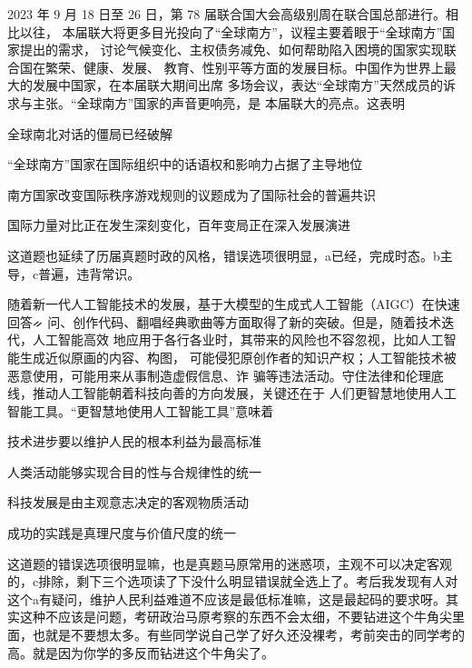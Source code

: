 \documentclass[lang=cn,blue,10pt,scheme=chinese,twocol]{zznote}
\begin{document}
\begin{exercise}2023 年 9 月 18 日至 26 日，第 78 届联合国大会高级别周在联合国总部进行。相比以往， 本届联大将更多目光投向了“全球南方”，议程主要着眼于“全球南方”国家提出的需求， 讨论气候变化、主权债务减免、如何帮助陷入困境的国家实现联合国在繁荣、健康、发展、 教育、性别平等方面的发展目标。中国作为世界上最大的发展中国家，在本届联大期间出席 多场会议，表达“全球南方”天然成员的诉求与主张。“全球南方”国家的声音更响亮，是 本届联大的亮点。这表明
	\begin{choice}
		\item 全球南北对话的僵局已经破解
		\item “全球南方”国家在国际组织中的话语权和影响力占据了主导地位
		\item 南方国家改变国际秩序游戏规则的议题成为了国际社会的普遍共识
		\item 国际力量对比正在发生深刻变化，百年变局正在深入发展演进
	\end{choice}
\end{exercise}
\begin{solution}
	这道题也延续了历届真题时政的风格，错误选项很明显，a已经，完成时态。b主导，c普遍，违背常识。
\end{solution}


\begin{exercise}随着新一代人工智能技术的发展，基于大模型的生成式人工智能（AIGC）在快速回答ᨀ 问、创作代码、翻唱经典歌曲等方面取得了新的突破。但是，随着技术迭代，人工智能高效 地应用于各行各业时，其带来的风险也不容忽视，比如人工智能生成近似原画的内容、构图， 可能侵犯原创作者的知识产权；人工智能技术被恶意使用，可能用来从事制造虚假信息、诈 骗等违法活动。守住法律和伦理底线，推动人工智能朝着科技向善的方向发展，关键还在于 人们更智慧地使用人工智能工具。“更智慧地使用人工智能工具”意味着
	\begin{choice}
		\item 技术进步要以维护人民的根本利益为最高标准
		\item 人类活动能够实现合目的性与合规律性的统一
		\item 科技发展是由主观意志决定的客观物质活动
		\item 成功的实践是真理尺度与价值尺度的统一
	\end{choice}
\end{exercise}
\begin{solution}
	​这道题的错误选项很明显嘛，也是真题马原常用的迷惑项，主观不可以决定客观的，c排除，剩下三个选项读了下没什么明显错误就全选上了。考后我发现有人对这个a有疑问，维护人民利益难道不应该是最低标准嘛，这是最起码的要求呀。其实这种不应该是问题，考研政治马原考察的东西不会太细，不要钻进这个牛角尖里面，也就是不要想太多。有些同学说自己学了好久还没裸考，考前突击的同学考的高。就是因为你学的多反而钻进这个牛角尖了。
\end{solution}
\end{document}
